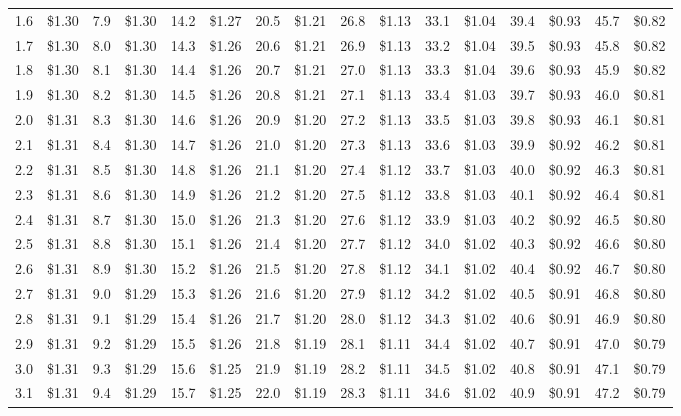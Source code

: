 \documentclass{article}
\begin{document}
\begin{tabular}{|*{8}{rr|}}
1.6 & \$1.30 & 7.9 & \$1.30 & 14.2 & \$1.27 & 20.5 & \$1.21 & 26.8 & \$1.13 & 33.1 & \$1.04 & 39.4 & \$0.93 & 45.7 & \$0.82\\
1.7 & \$1.30 & 8.0 & \$1.30 & 14.3 & \$1.26 & 20.6 & \$1.21 & 26.9 & \$1.13 & 33.2 & \$1.04 & 39.5 & \$0.93 & 45.8 & \$0.82\\
1.8 & \$1.30 & 8.1 & \$1.30 & 14.4 & \$1.26 & 20.7 & \$1.21 & 27.0 & \$1.13 & 33.3 & \$1.04 & 39.6 & \$0.93 & 45.9 & \$0.82\\
1.9 & \$1.30 & 8.2 & \$1.30 & 14.5 & \$1.26 & 20.8 & \$1.21 & 27.1 & \$1.13 & 33.4 & \$1.03 & 39.7 & \$0.93 & 46.0 & \$0.81\\
2.0 & \$1.31 & 8.3 & \$1.30 & 14.6 & \$1.26 & 20.9 & \$1.20 & 27.2 & \$1.13 & 33.5 & \$1.03 & 39.8 & \$0.93 & 46.1 & \$0.81\\
2.1 & \$1.31 & 8.4 & \$1.30 & 14.7 & \$1.26 & 21.0 & \$1.20 & 27.3 & \$1.13 & 33.6 & \$1.03 & 39.9 & \$0.92 & 46.2 & \$0.81\\
2.2 & \$1.31 & 8.5 & \$1.30 & 14.8 & \$1.26 & 21.1 & \$1.20 & 27.4 & \$1.12 & 33.7 & \$1.03 & 40.0 & \$0.92 & 46.3 & \$0.81\\
2.3 & \$1.31 & 8.6 & \$1.30 & 14.9 & \$1.26 & 21.2 & \$1.20 & 27.5 & \$1.12 & 33.8 & \$1.03 & 40.1 & \$0.92 & 46.4 & \$0.81\\
2.4 & \$1.31 & 8.7 & \$1.30 & 15.0 & \$1.26 & 21.3 & \$1.20 & 27.6 & \$1.12 & 33.9 & \$1.03 & 40.2 & \$0.92 & 46.5 & \$0.80\\
2.5 & \$1.31 & 8.8 & \$1.30 & 15.1 & \$1.26 & 21.4 & \$1.20 & 27.7 & \$1.12 & 34.0 & \$1.02 & 40.3 & \$0.92 & 46.6 & \$0.80\\
2.6 & \$1.31 & 8.9 & \$1.30 & 15.2 & \$1.26 & 21.5 & \$1.20 & 27.8 & \$1.12 & 34.1 & \$1.02 & 40.4 & \$0.92 & 46.7 & \$0.80\\
2.7 & \$1.31 & 9.0 & \$1.29 & 15.3 & \$1.26 & 21.6 & \$1.20 & 27.9 & \$1.12 & 34.2 & \$1.02 & 40.5 & \$0.91 & 46.8 & \$0.80\\
2.8 & \$1.31 & 9.1 & \$1.29 & 15.4 & \$1.26 & 21.7 & \$1.20 & 28.0 & \$1.12 & 34.3 & \$1.02 & 40.6 & \$0.91 & 46.9 & \$0.80\\
2.9 & \$1.31 & 9.2 & \$1.29 & 15.5 & \$1.26 & 21.8 & \$1.19 & 28.1 & \$1.11 & 34.4 & \$1.02 & 40.7 & \$0.91 & 47.0 & \$0.79\\
3.0 & \$1.31 & 9.3 & \$1.29 & 15.6 & \$1.25 & 21.9 & \$1.19 & 28.2 & \$1.11 & 34.5 & \$1.02 & 40.8 & \$0.91 & 47.1 & \$0.79\\
3.1 & \$1.31 & 9.4 & \$1.29 & 15.7 & \$1.25 & 22.0 & \$1.19 & 28.3 & \$1.11 & 34.6 & \$1.02 & 40.9 & \$0.91 & 47.2 & \$0.79\\

\end{tabular}
\end{document}
